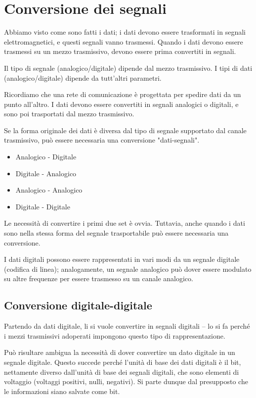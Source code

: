 \section{Conversione dei segnali}

    Abbiamo visto come sono fatti i dati; i dati devono essere trasformati in segnali elettromagnetici, e questi segnali vanno trasmessi. Quando i dati devono essere trasmessi su un mezzo trasmissivo, devono essere prima convertiti in segnali.
    
    Il tipo di segnale (analogico/digitale) dipende dal mezzo trasmissivo. I tipi di dati (analogico/digitale) dipende da tutt'altri parametri.
    
    Ricordiamo che una rete di comunicazione è progettata per spedire dati da un punto all'altro. I dati devono essere convertiti in segnali analogici o digitali, e sono poi trasportati dal mezzo trasmissivo.
    
    Se la forma originale dei dati è diversa dal tipo di segnale supportato dal canale trasmissivo, può essere necessaria una conversione "dati-segnali".
    
    \begin{itemize}
        \item Analogico - Digitale
        \item Digitale - Analogico
        \item Analogico - Analogico
        \item Digitale - Digitale
    \end{itemize}
    
    Le necessità di convertire i primi due set è ovvia. Tuttavia, anche quando i dati sono nella stessa forma del segnale trasportabile può essere necessaria una conversione. 
    
    I dati digitali possono essere rappresentati in vari modi da un segnale digitale (codifica di linea); analogamente, un segnale analogico può dover essere modulato su altre frequenze per essere trasmesso su un canale analogico.
    
    \subsection{Conversione digitale-digitale}
    
        Partendo da dati digitale, li si vuole convertire in segnali digitali -- lo si fa perché i mezzi trasmissivi adoperati impongono questo tipo di rappresentazione.
        
        Può risultare ambigua la necessità di dover convertire un dato digitale in un segnale digitale. Questo succede perché l'unità di base dei dati digitali è il bit, nettamente diverso dall'unità di base dei segnali digitali, che sono elementi di voltaggio (voltaggi positivi, nulli, negativi). Si parte dunque dal presupposto che le informazioni siano salvate come bit.
        
